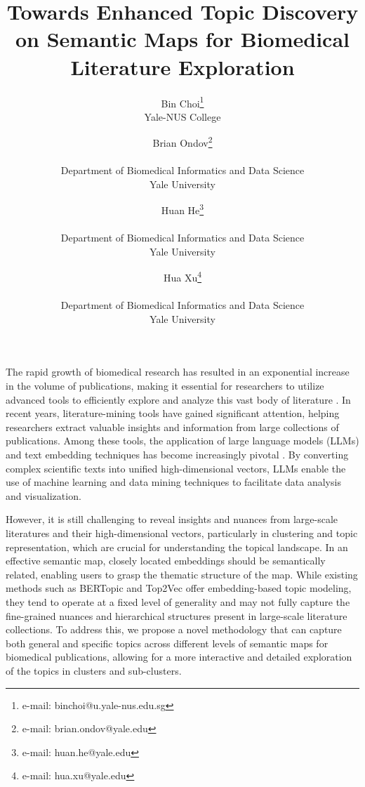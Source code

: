 \documentclass{vgtc}                          %
\title{Towards Enhanced Topic Discovery on Semantic Maps for Biomedical Literature Exploration}
\author{Bin Choi\thanks{e-mail: binchoi@u.yale-nus.edu.sg}\\ %
        \scriptsize Yale-NUS College %
\and Brian Ondov\thanks{e-mail: brian.ondov@yale.edu}\\ %
     \parbox{1.5in}{\scriptsize \centering Department of Biomedical Informatics and Data Science \\ Yale University} %
\and Huan He\thanks{e-mail: huan.he@yale.edu}\\ %
     \parbox{1.5in}{\scriptsize \centering Department of Biomedical Informatics and Data Science \\ Yale University} %
\and Hua Xu\thanks{e-mail: hua.xu@yale.edu}\\ %
     \parbox{1.5in}{\scriptsize \centering Department of Biomedical Informatics and Data Science \\ Yale University} %
}
\begin{document}


\maketitle

The rapid growth of biomedical research has resulted in an exponential increase in the volume of publications, making it essential for researchers to utilize advanced tools to efficiently explore and analyze this vast body of literature \cite{Gonzalez-Marquez2024}. In recent years, literature-mining tools have gained significant attention, helping researchers extract valuable insights and information from large collections of publications. Among these tools, the application of large language models (LLMs) and text embedding techniques has become increasingly pivotal \cite{Simon2024}. By converting complex scientific texts into unified high-dimensional vectors, LLMs enable the use of machine learning and data mining techniques to facilitate data analysis and visualization.

However, it is still challenging to reveal insights and nuances from large-scale literatures and their high-dimensional vectors, particularly in clustering and topic representation, which are crucial for understanding the topical landscape. In an effective semantic map, closely located embeddings should be semantically related, enabling users to grasp the thematic structure of the map. While existing methods such as BERTopic \cite{Grootendorst2022} and Top2Vec \cite{Angelov2020} offer embedding-based topic modeling, they tend to operate at a fixed level of generality and may not fully capture the fine-grained nuances and hierarchical structures present in large-scale literature collections. To address this, we propose a novel methodology that can capture both general and specific topics across different levels of semantic maps for biomedical publications, allowing for a more interactive and detailed exploration of the topics in clusters and sub-clusters. 
\end{document}

